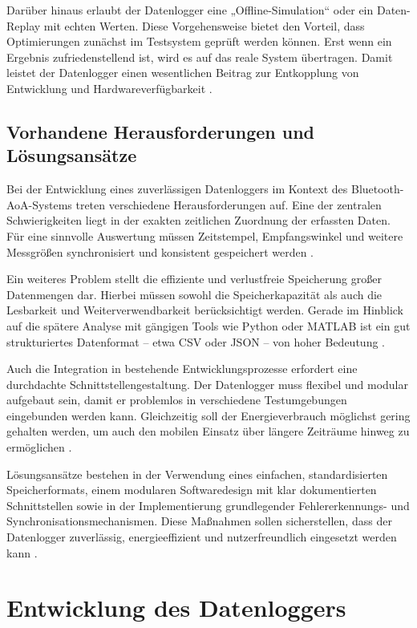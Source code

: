 \documentclass[a4paper, 12pt]{article} %
\begin{document}
Darüber hinaus erlaubt der Datenlogger eine „Offline-Simulation“ oder ein Daten-Replay mit echten Werten. Diese Vorgehensweise bietet den Vorteil, dass Optimierungen zunächst im Testsystem geprüft werden können. Erst wenn ein Ergebnis zufriedenstellend ist, wird es auf das reale System übertragen. Damit leistet der Datenlogger einen wesentlichen Beitrag zur Entkopplung von Entwicklung und Hardwareverfügbarkeit \cite{dwyer2015what}.

\subsection{Vorhandene Herausforderungen und Lösungsansätze}
Bei der Entwicklung eines zuverlässigen Datenloggers im Kontext des Bluetooth-\ac{AoA}-Systems treten verschiedene Herausforderungen auf. Eine der zentralen Schwierigkeiten liegt in der exakten zeitlichen Zuordnung der erfassten Daten. Für eine sinnvolle Auswertung müssen Zeitstempel, Empfangswinkel und weitere Messgrößen synchronisiert und konsistent gespeichert werden \cite{rs2022guide}.

Ein weiteres Problem stellt die effiziente und verlustfreie Speicherung großer Datenmengen dar. Hierbei müssen sowohl die Speicherkapazität als auch die Lesbarkeit und Weiterverwendbarkeit berücksichtigt werden. Gerade im Hinblick auf die spätere Analyse mit gängigen Tools wie Python oder MATLAB ist ein gut strukturiertes Datenformat – etwa \ac{CSV} oder \ac{JSON} – von hoher Bedeutung \cite{dewesoft2024guide}.

Auch die Integration in bestehende Entwicklungsprozesse erfordert eine durchdachte Schnittstellengestaltung. Der Datenlogger muss flexibel und modular aufgebaut sein, damit er problemlos in verschiedene Testumgebungen eingebunden werden kann. Gleichzeitig soll der Energieverbrauch möglichst gering gehalten werden, um auch den mobilen Einsatz über längere Zeiträume hinweg zu ermöglichen \cite{smith2018sensors}.

Lösungsansätze bestehen in der Verwendung eines einfachen, standardisierten Speicherformats, einem modularen Softwaredesign mit klar dokumentierten Schnittstellen sowie in der Implementierung grundlegender Fehlererkennungs- und Synchronisationsmechanismen. Diese Maßnahmen sollen sicherstellen, dass der Datenlogger zuverlässig, energieeffizient und nutzerfreundlich eingesetzt werden kann \cite{poole2020data}.

\clearpage

\section{Entwicklung des Datenloggers}
\end{document}

